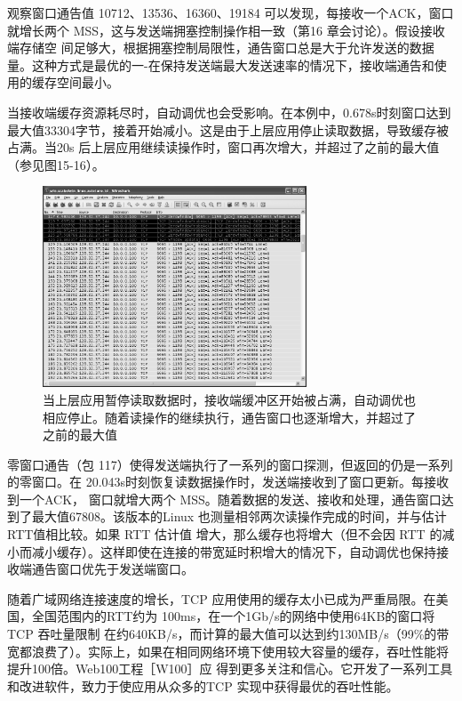 观察窗口通告值 10712、13536、16360、19184 可以发现，每接收一个ACK，窗口就增长两个 MSS，这与发送端拥塞控制操作相一致（第16 章会讨论）。假设接收端存储空
间足够大，根据拥塞控制局限性，通告窗口总是大于允许发送的数据量。这种方式是最优的一-在保持发送端最大发送速率的情况下，接收端通告和使用的缓存空间最小。

当接收端缓存资源耗尽时，自动调优也会受影响。在本例中，0.678s时刻窗口达到最大值33304字节，接着开始减小。这是由于上层应用停止读取数据，导致缓存被占满。当20s
后上层应用继续读操作时，窗口再次增大，并超过了之前的最大值（参见图15-16）。
\begin{figure}[!htb]
    \centering
	\includegraphics[width=0.7\textwidth]{imgs/15/15-16.png}
	\caption{当上层应用暂停读取数据时，接收端缓冲区开始被占满，自动调优也相应停止。随着读操作的继续执行，通告窗口也逐渐增大，并超过了之前的最大值}
\end{figure}

零窗口通告（包 117）使得发送端执行了一系列的窗口探测，但返回的仍是一系列的零窗口。在 20.043s时刻恢复读数据操作时，发送端接收到了窗口更新。每接收到一个ACK，
窗口就增大两个 MSS。随着数据的发送、接收和处理，通告窗口达到了最大值67808。该版本的Linux 也测量相邻两次读操作完成的时间，并与估计 RTT值相比较。如果 RTT 估计值
增大，那么缓存也将增大（但不会因 RTT 的减小而减小缓存）。这样即使在连接的带宽延时积增大的情况下，自动调优也保持接收端通告窗口优先于发送端窗口。

随着广域网络连接速度的增长，TCP 应用使用的缓存太小已成为严重局限。在美国，全国范围内的RTT约为 100ms，在一个1Gb/s的网络中使用64KB的窗口将 TCP 吞吐量限制
在约640KB/s，而计算的最大值可以达到约130MB/s（99\%的带宽都浪费了）。实际上，如果在相同网络环境下使用较大容量的缓存，吞吐性能将提升100倍。Web100工程［W100］应
得到更多关注和信心。它开发了一系列工具和改进软件，致力于使应用从众多的TCP 实现中获得最优的吞吐性能。


